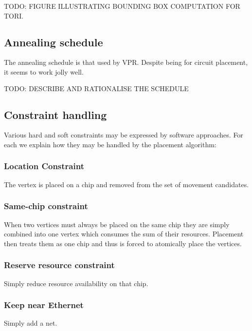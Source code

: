 			TODO: FIGURE ILLUSTRATING BOUNDING BOX COMPUTATION FOR TORI.
		
		\subsection{Annealing schedule}
			
			The annealing schedule is that used by VPR. Despite being for circuit
			placement, it seems to work jolly well.
			
			TODO: DESCRIBE AND RATIONALISE THE SCHEDULE
		
		\subsection{Constraint handling}
			
			Various hard and soft constraints may be expressed by software
			approaches. For each we explain how they may be handled by the placement
			algorithm:
			
			\subsubsection{Location Constraint}
				
				The vertex is placed on a chip and removed from the set of movement
				candidates.
			
			\subsubsection{Same-chip constraint}
				
				When two vertices must always be placed on the same chip they are
				simply combined into one vertex which consumes the sum of their
				resources. Placement then treats them as one chip and thus is forced to
				atomically place the vertices.
			
			\subsubsection{Reserve resource constraint}
				
				Simply reduce resource availability on that chip.
			
			\subsubsection{Keep near Ethernet}
				
				Simply add a net.
	
